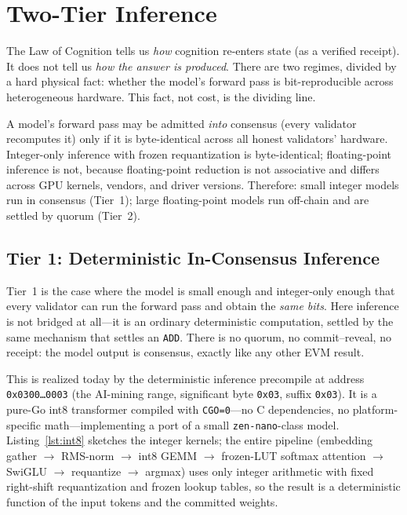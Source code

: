 \section{Two-Tier Inference}
\label{sec:twotier}

The Law of Cognition tells us \emph{how} cognition re-enters state (as a verified receipt). It does not tell us \emph{how the answer is produced}. There are two regimes, divided by a hard physical fact: whether the model's forward pass is bit-reproducible across heterogeneous hardware. This fact, not cost, is the dividing line.

\begin{principle}
\label{prin:repro}
A model's forward pass may be admitted \emph{into} consensus (every validator recomputes it) only if it is byte-identical across all honest validators' hardware. Integer-only inference with frozen requantization is byte-identical; floating-point inference is not, because floating-point reduction is not associative and differs across GPU kernels, vendors, and driver versions. Therefore: small integer models run in consensus (Tier~1); large floating-point models run off-chain and are settled by quorum (Tier~2).
\end{principle}

\subsection{Tier 1: Deterministic In-Consensus Inference}

Tier~1 is the case where the model is small enough and integer-only enough that every validator can run the forward pass and obtain the \emph{same bits}. Here inference is not bridged at all---it is an ordinary deterministic computation, settled by the same mechanism that settles an \texttt{ADD}. There is no quorum, no commit--reveal, no receipt: the model output is consensus, exactly like any other EVM result.

This is realized today by the \Lux{} deterministic inference precompile at address \texttt{0x0300\dots0003} (the AI-mining range, significant byte \texttt{0x03}, suffix \texttt{0x03}). It is a pure-Go int8 transformer compiled with \texttt{CGO=0}---no C dependencies, no platform-specific math---implementing a port of a small \texttt{zen-nano}-class model. Listing~\ref{lst:int8} sketches the integer kernels; the entire pipeline (embedding gather $\to$ RMS-norm $\to$ int8 GEMM $\to$ frozen-LUT softmax attention $\to$ SwiGLU $\to$ requantize $\to$ argmax) uses only integer arithmetic with fixed right-shift requantization and frozen lookup tables, so the result is a deterministic function of the input tokens and the committed weights.

